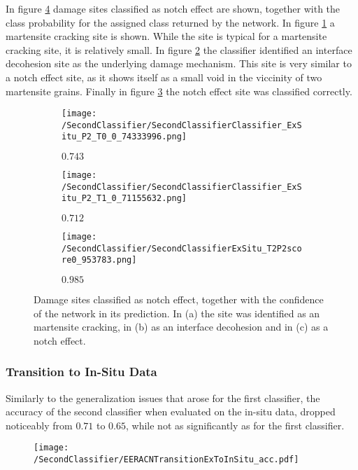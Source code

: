 In figure \ref{fig:ExSituNotchEffectSamples} damage sites classified as notch effect are shown, together with the class probability for the assigned class returned by the network. In figure \ref{sub:ExSituNotchEffectSamplesM} a martensite cracking site is shown. While the site is typical for a martensite cracking site, it is relatively small. In figure \ref{sub:ExSituNotchEffectSamplesI} the classifier identified an interface decohesion site as the underlying damage mechanism. This site is very similar to a notch effect site, as it shows itself as a small void in the viccinity of two martensite grains. Finally in figure \ref{sub:ExSituNotchEffectSamplesN} the notch effect site was classified correctly. 

\begin{figure}[H]
\centering
\begin{subfigure}{0.3\textwidth}
\texttt{[image: /SecondClassifier/SecondClassifierClassifier\_ExSitu\_P2\_T0\_0\_74333996.png]}
\caption{$0.743$}
\label{sub:ExSituNotchEffectSamplesM}
\end{subfigure}
\begin{subfigure}{0.3\textwidth}
\texttt{[image: /SecondClassifier/SecondClassifierClassifier\_ExSitu\_P2\_T1\_0\_71155632.png]}
\caption{$0.712$}
\label{sub:ExSituNotchEffectSamplesI}
\end{subfigure}
\begin{subfigure}{0.3\textwidth}
\texttt{[image: /SecondClassifier/SecondClassifierExSitu\_T2P2score0\_953783.png]}
\caption{$0.985$}
\label{sub:ExSituNotchEffectSamplesN}
\end{subfigure}
\caption{Damage sites classified as notch effect, together with the confidence of the network in its prediction. In (a) the site was identified as an martensite cracking, in (b) as an interface decohesion and in (c) as a notch effect. }
\label{fig:ExSituNotchEffectSamples}
\end{figure}


\subsubsection{Transition to In-Situ Data}
Similarly to the generalization issues that arose for the first classifier, the accuracy of the second classifier when evaluated on the in-situ data, dropped noticeably from $0.71$ to $0.65$, while not as significantly as for the first classifier.

\begin{figure}[H]
\centering
\texttt{[image: /SecondClassifier/EERACNTransitionExToInSitu\_acc.pdf]}
\end{figure}

